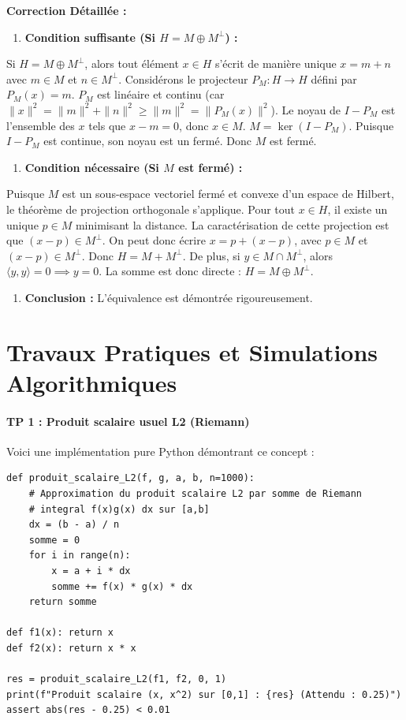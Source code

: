 \documentclass[11pt,a4paper]{article}
\begin{document}
\textbf{Correction Détaillée :}
\begin{enumerate}
\item \textbf{Condition suffisante (Si $H = M \oplus M^\perp$) :}
\end{enumerate}
   Si $H = M \oplus M^\perp$, alors tout élément $x \in H$ s'écrit de manière unique $x = m + n$ avec $m \in M$ et $n \in M^\perp$.
   Considérons le projecteur $P_M: H \to H$ défini par $P_M(x) = m$. $P_M$ est linéaire et continu (car $\|x\|^2 = \|m\|^2 + \|n\|^2 \ge \|m\|^2 = \|P_M(x)\|^2$).
   Le noyau de $I - P_M$ est l'ensemble des $x$ tels que $x - m = 0$, donc $x \in M$.
   $M = \ker(I - P_M)$. Puisque $I - P_M$ est continue, son noyau est un fermé. Donc $M$ est fermé.
\begin{enumerate}
\item \textbf{Condition nécessaire (Si $M$ est fermé) :}
\end{enumerate}
   Puisque $M$ est un sous-espace vectoriel fermé et convexe d'un espace de Hilbert, le théorème de projection orthogonale s'applique.
   Pour tout $x \in H$, il existe un unique $p \in M$ minimisant la distance. La caractérisation de cette projection est que $(x-p) \in M^\perp$.
   On peut donc écrire $x = p + (x-p)$, avec $p \in M$ et $(x-p) \in M^\perp$. Donc $H = M + M^\perp$.
   De plus, si $y \in M \cap M^\perp$, alors $\langle y, y \rangle = 0 \implies y=0$. La somme est donc directe : $H = M \oplus M^\perp$.
\begin{enumerate}
\item \textbf{Conclusion :} L'équivalence est démontrée rigoureusement.
\end{enumerate}





\newpage
\part{Travaux Pratiques et Simulations Algorithmiques}
\subsection*{TP 1 : Produit scalaire usuel L2 (Riemann)}
Voici une implémentation pure Python démontrant ce concept :
\begin{lstlisting}
def produit_scalaire_L2(f, g, a, b, n=1000):
    # Approximation du produit scalaire L2 par somme de Riemann
    # integral f(x)g(x) dx sur [a,b]
    dx = (b - a) / n
    somme = 0
    for i in range(n):
        x = a + i * dx
        somme += f(x) * g(x) * dx
    return somme

def f1(x): return x
def f2(x): return x * x

res = produit_scalaire_L2(f1, f2, 0, 1)
print(f"Produit scalaire (x, x^2) sur [0,1] : {res} (Attendu : 0.25)")
assert abs(res - 0.25) < 0.01
\end{lstlisting}
\end{document}
